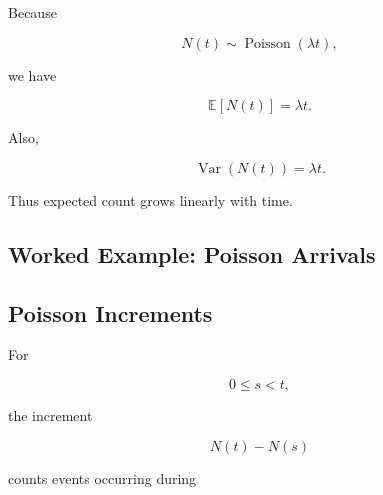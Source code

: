 Because

\[
N(t)
\sim
\operatorname{Poisson}(\lambda t),
\]

we have

\[
\boxed{
\mathbb{E}[N(t)]
=
\lambda t.
}
\]

Also,

\[
\boxed{
\operatorname{Var}(N(t))
=
\lambda t.
}
\]

Thus expected count grows linearly with time.

\subsection{Worked Example: Poisson Arrivals}
\label{subsec:worked-poisson-arrivals}


\subsection{Poisson Increments}
\label{subsec:poisson-increments}

For

\[
0\leq s<t,
\]

the increment

\[
N(t)-N(s)
\]

counts events occurring during

